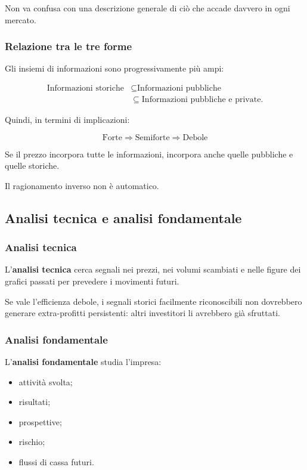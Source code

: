 \noindent Non va confusa con una descrizione generale
di ciò che accade davvero in ogni mercato.


\subsubsection*{Relazione tra le tre forme}

\noindent Gli insiemi di informazioni
sono progressivamente più ampi:

\[
\begin{aligned}
\text{Informazioni storiche}
&\subseteq
\text{Informazioni pubbliche}\\
&\subseteq
\text{Informazioni pubbliche e private}.
\end{aligned}
\]

\noindent Quindi, in termini di implicazioni:

\[
\boxed{
\text{Forte}
\Rightarrow
\text{Semiforte}
\Rightarrow
\text{Debole}
}
\]

\noindent Se il prezzo incorpora tutte le informazioni,
incorpora anche quelle pubbliche e quelle storiche.

\noindent Il ragionamento inverso
non è automatico.


\subsection{Analisi tecnica e analisi fondamentale}

\subsubsection*{Analisi tecnica}

\noindent L'\textbf{analisi tecnica} cerca segnali
nei prezzi, nei volumi scambiati
e nelle figure dei grafici passati
per prevedere i movimenti futuri.

\noindent Se vale l'efficienza debole,
i segnali storici facilmente riconoscibili
non dovrebbero generare extra-profitti persistenti:
altri investitori li avrebbero già sfruttati.


\subsubsection*{Analisi fondamentale}

\noindent L'\textbf{analisi fondamentale}
studia l'impresa:

\begin{itemize}
    \item attività svolta;
    \item risultati;
    \item prospettive;
    \item rischio;
    \item flussi di cassa futuri.
\end{itemize}

